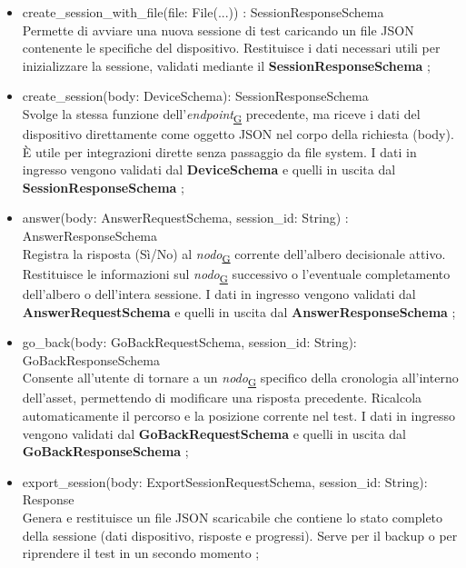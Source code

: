\documentclass[a4paper,12pt]{article}
\begin{document}
                    \begin{itemize}
                        \item {\ttfamily create\_session\_with\_file(file: File(...)) : SessionResponseSchema} \\ Permette di avviare una nuova sessione di test caricando un file JSON contenente le specifiche del dispositivo. Restituisce i dati necessari utili per inizializzare la sessione, validati mediante il \textbf{SessionResponseSchema} ;
                        \item {\ttfamily create\_session(body: DeviceSchema): SessionResponseSchema} \\ Svolge la stessa funzione dell'\textit{endpoint}\textsubscript{\href{https://atlasteam9.github.io/Atlas/glossario.html\#Endpoint}{G}} precedente, ma riceve i dati del dispositivo direttamente come oggetto JSON nel corpo della richiesta (body). È utile per integrazioni dirette senza passaggio da file system. I dati in ingresso vengono validati dal \textbf{DeviceSchema} e quelli in uscita dal \textbf{SessionResponseSchema} ;                         
                        \item {\ttfamily answer(body: AnswerRequestSchema, session\_id: String) : AnswerResponseSchema} \\ Registra la risposta (Sì/No) al \textit{nodo}\textsubscript{\href{https://atlasteam9.github.io/Atlas/glossario.html\#Nodo}{G}} corrente dell'albero decisionale attivo. Restituisce le informazioni sul \textit{nodo}\textsubscript{\href{https://atlasteam9.github.io/Atlas/glossario.html\#Nodo}{G}} successivo o l'eventuale completamento dell'albero o dell'intera sessione. I dati in ingresso vengono validati dal \textbf{AnswerRequestSchema} e quelli in uscita dal \textbf{AnswerResponseSchema} ; 
                        \item {\ttfamily go\_back(body: GoBackRequestSchema, session\_id: String): GoBackResponseSchema} \\ Consente all'utente di tornare a un \textit{nodo}\textsubscript{\href{https://atlasteam9.github.io/Atlas/glossario.html\#Nodo}{G}} specifico della cronologia all'interno dell'asset, permettendo di modificare una risposta precedente. Ricalcola automaticamente il percorso e la posizione corrente nel test. I dati in ingresso vengono validati dal \textbf{GoBackRequestSchema} e quelli in uscita dal \textbf{GoBackResponseSchema} ; 
                        \item {\ttfamily export\_session(body: ExportSessionRequestSchema, session\_id: String): Response} \\ Genera e restituisce un file JSON scaricabile che contiene lo stato completo della sessione (dati dispositivo, risposte e progressi). Serve per il backup o per riprendere il test in un secondo momento ; 

\end{itemize}
\end{document}
